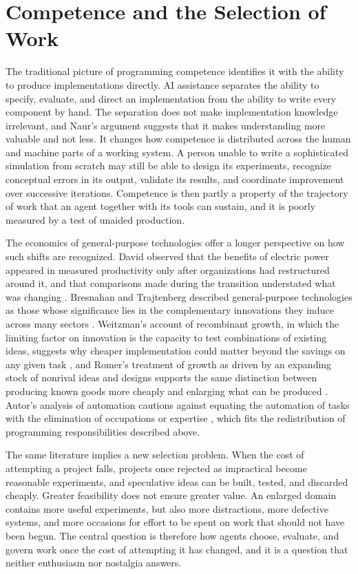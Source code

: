 \documentclass[11pt]{article}
\theoremstyle{remark}
\begin{document}
\section{Competence and the Selection of Work}

The traditional picture of programming competence identifies it with the ability to produce implementations directly. AI assistance separates the ability to specify, evaluate, and direct an implementation from the ability to write every component by hand. The separation does not make implementation knowledge irrelevant, and Naur's argument suggests that it makes understanding more valuable and not less. It changes how competence is distributed across the human and machine parts of a working system. A person unable to write a sophisticated simulation from scratch may still be able to design its experiments, recognize conceptual errors in its output, validate its results, and coordinate improvement over successive iterations. Competence is then partly a property of the trajectory of work that an agent together with its tools can sustain, and it is poorly measured by a test of unaided production.

The economics of general-purpose technologies offer a longer perspective on how such shifts are recognized. David observed that the benefits of electric power appeared in measured productivity only after organizations had restructured around it, and that comparisons made during the transition understated what was changing \cite{david1990}. Bresnahan and Trajtenberg described general-purpose technologies as those whose significance lies in the complementary innovations they induce across many sectors \cite{bresnahan1995}. Weitzman's account of recombinant growth, in which the limiting factor on innovation is the capacity to test combinations of existing ideas, suggests why cheaper implementation could matter beyond the savings on any given task \cite{weitzman1998}, and Romer's treatment of growth as driven by an expanding stock of nonrival ideas and designs supports the same distinction between producing known goods more cheaply and enlarging what can be produced \cite{romer1990}. Autor's analysis of automation cautions against equating the automation of tasks with the elimination of occupations or expertise \cite{autor2015}, which fits the redistribution of programming responsibilities described above.

The same literature implies a new selection problem. When the cost of attempting a project falls, projects once rejected as impractical become reasonable experiments, and speculative ideas can be built, tested, and discarded cheaply. Greater feasibility does not ensure greater value. An enlarged domain contains more useful experiments, but also more distractions, more defective systems, and more occasions for effort to be spent on work that should not have been begun. The central question is therefore how agents choose, evaluate, and govern work once the cost of attempting it has changed, and it is a question that neither enthusiasm nor nostalgia answers.
\end{document}
